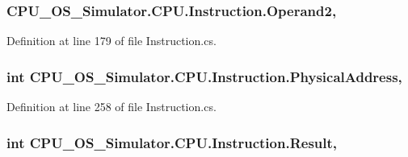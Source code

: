 \subsubsection[{Operand2}]{ C\+P\+U\+\_\+\+O\+S\+\_\+\+Simulator.\+C\+P\+U.\+Instruction.\+Operand2\hspace{0.3cm}{\ttfamily [get]}, {\ttfamily [set]}}\label{class_c_p_u___o_s___simulator_1_1_c_p_u_1_1_instruction_ab35e6667e7c2f42dd09965995e25ff2d}


Definition at line 179 of file Instruction.\+cs.

\hypertarget{class_c_p_u___o_s___simulator_1_1_c_p_u_1_1_instruction_a97b20c8a0a7536bdddd8e791605a8bac}{}
\subsubsection[{Physical\+Address}]{\setlength{\rightskip}{0pt plus 5cm}int C\+P\+U\+\_\+\+O\+S\+\_\+\+Simulator.\+C\+P\+U.\+Instruction.\+Physical\+Address\hspace{0.3cm}{\ttfamily [get]}, {\ttfamily [set]}}\label{class_c_p_u___o_s___simulator_1_1_c_p_u_1_1_instruction_a97b20c8a0a7536bdddd8e791605a8bac}


Definition at line 258 of file Instruction.\+cs.

\hypertarget{class_c_p_u___o_s___simulator_1_1_c_p_u_1_1_instruction_a8e0f7c63850af7cfd8a41c066c01838e}{}
\subsubsection[{Result}]{\setlength{\rightskip}{0pt plus 5cm}int C\+P\+U\+\_\+\+O\+S\+\_\+\+Simulator.\+C\+P\+U.\+Instruction.\+Result\hspace{0.3cm}{\ttfamily [get]}, {\ttfamily [set]}}\label{class_c_p_u___o_s___simulator_1_1_c_p_u_1_1_instruction_a8e0f7c63850af7cfd8a41c066c01838e}


